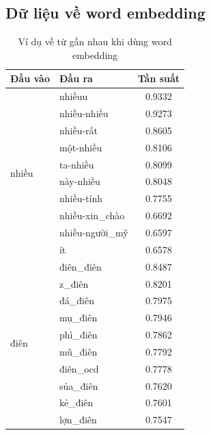 \subsection*{Dữ liệu về word embedding}
\begin{table}[htb]
    \centering
    \caption{Ví dụ về từ gần nhau khi dùng word embedding}
    \label{table:fasttext-mostsimilar}
    \begin{tabular}{l l c}
        \toprule
        \textbf{Đầu vào}        & \textbf{Đầu ra} & \textbf{Tần suất} \\\midrule
        \multirow{10}{*}{nhiều} & nhiềuu          & 0.9332            \\
                                & nhiều-nhiều     & 0.9273            \\
                                & nhiều-rất       & 0.8605            \\
                                & một-nhiều       & 0.8106            \\
                                & ta-nhiều        & 0.8099            \\
                                & này-nhiều       & 0.8048            \\
                                & nhiều-tính      & 0.7755            \\
                                & nhiều-xin\_chào & 0.6692            \\
                                & nhiều-người\_mỹ & 0.6597            \\
                                & ít              & 0.6578            \\\midrule
        \multirow{10}{*}{điên}  & điên\_điên      & 0.8487            \\
                                & z\_điên         & 0.8201            \\
                                & đá\_điên        & 0.7975            \\
                                & mụ\_điên        & 0.7946            \\
                                & phì\_điên       & 0.7862            \\
                                & mũ\_điên        & 0.7792            \\
                                & điên\_ocd       & 0.7778            \\
                                & sủa\_điên       & 0.7620            \\
                                & kẻ\_điên        & 0.7601            \\
                                & lợn\_điên       & 0.7547            \\
        \bottomrule
    \end{tabular}
\end{table}

